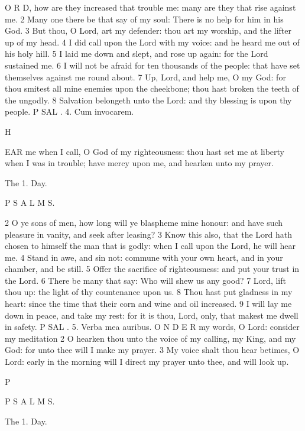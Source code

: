 O R D, how are they increased that trouble me: many are they that rise against me. 2 Many one there be that say of my soul: There is no help for him in his God. 3 But thou, O Lord, art my defender: thou art my worship, and the lifter up of my head. 4 I did call upon the Lord with my voice: and he heard me out of his holy hill. 5 I laid me down and slept, and rose up again: for the Lord sustained me. 6 I will not be afraid for ten thousands of the people: that have set themselves against me round about. 7 Up, Lord, and help me, O my God: for thou smitest all mine enemies upon the cheekbone; thou hast broken the teeth of the ungodly. 8 Salvation belongeth unto the Lord: and thy blessing is upon thy people. P SAL . 4. Cum invocarem.

H

EAR me when I call, O God of my righteousness: thou hast set me at liberty when I was in trouble; have mercy upon me, and hearken unto my prayer.

The 1. Day.

P S A L M S.

2 O ye sons of men, how long will ye blaspheme mine honour: and have such pleasure in vanity, and seek after leasing? 3 Know this also, that the Lord hath chosen to himself the man that is godly: when I call upon the Lord, he will hear me. 4 Stand in awe, and sin not: commune with your own heart, and in your chamber, and be still. 5 Offer the sacrifice of righteousness: and put your trust in the Lord. 6 There be many that say: Who will shew us any good? 7 Lord, lift thou up: the light of thy countenance upon us. 8 Thou hast put gladness in my heart: since the time that their corn and wine and oil increased. 9 I will lay me down in peace, and take my rest: for it is thou, Lord, only, that makest me dwell in safety. P SAL . 5. Verba mea auribus. O N D E R my words, O Lord: consider my meditation 2 O hearken thou unto the voice of my calling, my King, and my God: for unto thee will I make my prayer. 3 My voice shalt thou hear betimes, O Lord: early in the morning will I direct my prayer unto thee, and will look up.

P

P S A L M S.

The 1. Day.

